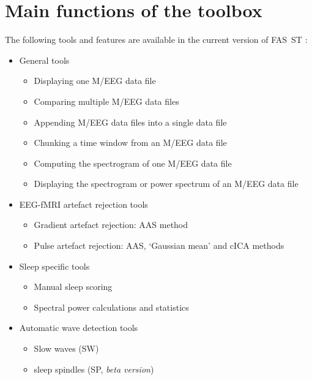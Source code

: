 \documentclass[a4paper,titlepage]{article}
\def\dblS{\hbox{S\hskip -4.5pt S}}
\newcommand{\bi}{\begin{itemize}}
\newcommand{\ei}{\end{itemize}}
\newcommand{\fasst}{FA\dblS T } 	%
\begin{document}
\section{Main functions of the toolbox}
\label{sec:functions}

The following tools and features are available in the current version of \fasst\hspace{-4pt}:
\bi\addtolength{\itemsep}{-1\baselineskip}
\item	General tools \\
\bi\addtolength{\itemsep}{-1\baselineskip}
\item Displaying one M/EEG data file\\
\item Comparing multiple M/EEG data files\\
\item Appending M/EEG data files into a single data file\\
\item Chunking a time window from an M/EEG data file\\
\item Computing the spectrogram of one M/EEG data file\\
\item Displaying the spectrogram or power spectrum of an M/EEG data file\\
\ei
\item EEG-fMRI artefact rejection tools\\
\bi\addtolength{\itemsep}{-1\baselineskip}
\item Gradient artefact rejection: AAS method\\
\item Pulse artefact rejection: AAS, `Gaussian mean' and cICA methods\\
\ei
\item Sleep specific tools\\
\bi\addtolength{\itemsep}{-1\baselineskip}
\item Manual sleep scoring\\
\item Spectral power calculations and statistics\\
\ei
\item Automatic wave detection tools\\
\bi\addtolength{\itemsep}{-1\baselineskip}
\item Slow waves (SW)\\
\item sleep spindles (SP, {\it beta version}) 
\ei
\ei
\end{document}
